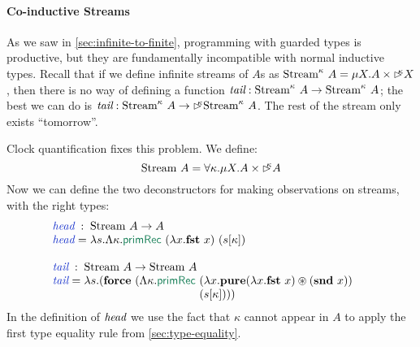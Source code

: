 \paragraph{Co-inductive Streams} As we saw in
\autoref{sec:infinite-to-finite}, programming with guarded types is
productive, but they are fundamentally incompatible with normal
inductive types. Recall that if we define infinite streams of $A$s as
$\textrm{Stream}^\kappa~A = \mu X. A \times \mathord{\rhd\kern-0.4em^{\kappa}} X$, then
there is no way of defining a function $\textit{tail} :
\textrm{Stream}^\kappa~A \to \textrm{Stream}^\kappa~A$; the best we
can do is $\textit{tail} : \textrm{Stream}^\kappa~A \to
\mathord{\rhd\kern-0.4em^{\kappa}}\textrm{Stream}^\kappa~A$. The rest of the stream only
exists ``tomorrow''.

Clock quantification fixes this problem. We define:
\begin{displaymath}
  \textrm{Stream}~A = \forall \kappa. \mu X. A \times \mathord{\rhd\kern-0.4em^{\kappa}} A
\end{displaymath}
Now we can define the two deconstructors for making observations on
streams, with the right types:
\begin{displaymath}
  \begin{array}{@{}l}
    \begin{array}{@{}l@{\hspace{0.3em}}c@{\hspace{0.3em}}l}
      \defn{head} &:& \tyname{Stream}~A \to A \\
      \defn{head} &=& \lambda s. \Lambda \kappa. \elim{primRec}~(\lambda x. \kw{fst}~x)~(s[\kappa]) \\
    \end{array}\\
    \\
    \begin{array}{@{}l@{\hspace{0.3em}}c@{\hspace{0.3em}}l}
      \defn{tail} &:& \tyname{Stream}~A \to \tyname{Stream}~A \\
      \defn{tail} &=& \lambda s. (\kw{force}~(\Lambda \kappa. \elim{primRec}~
      \begin{array}[t]{@{}l}
        (\lambda x. \kw{pure}(\lambda x. \kw{fst}~x) \circledast (\kw{snd}~x)) \\
        (s[\kappa])))
      \end{array}
    \end{array}
  \end{array}
\end{displaymath}
In the definition of $\textit{head}$ we use the fact that $\kappa$
cannot appear in $A$ to apply the first type equality rule from
\autoref{sec:type-equality}.

